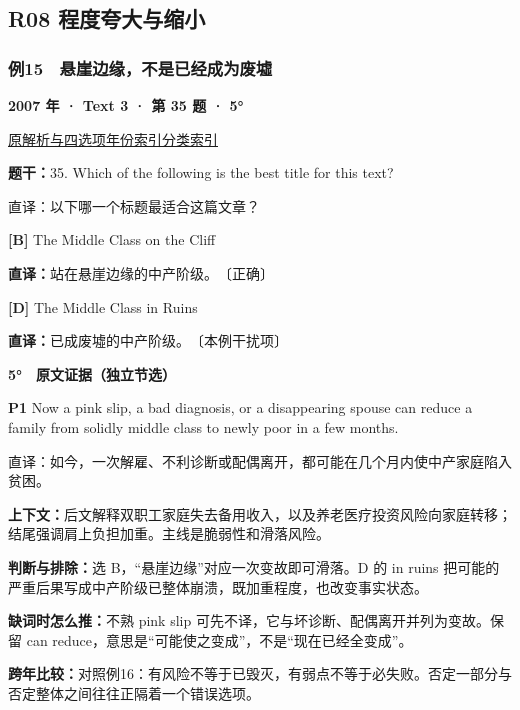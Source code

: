 \documentclass[11pt,a4paper]{article}
\begin{document}
\subsection{R08 程度夸大与缩小}
\subsubsection{例15　悬崖边缘，不是已经成为废墟}\label{case-2007-T3-Q35}
\noindent\textbf{2007 年 · Text 3 · 第 35 题 · 5°}\par\noindent \href{https://zj139.github.io/math-notes/english/346f4d489f00121c1d163691/\#q35}{原解析与四选项}\quad \hyperref[idx-2007-T3-Q35]{年份索引}\quad \hyperref[class-R08]{分类索引}\par\smallskip
\noindent\textbf{题干：}35. Which of the following is the best title for this text?\par
直译：以下哪一个标题最适合这篇文章？\par
{}\noindent\textbf{[B]} The Middle Class on the Cliff\par\nopagebreak
\noindent\textbf{直译：}站在悬崖边缘的中产阶级。　〔正确〕\par
{}\noindent\textbf{[D]} The Middle Class in Ruins\par\nopagebreak
\noindent\textbf{直译：}已成废墟的中产阶级。　〔本例干扰项〕\par
\begin{evidence}\textbf{5°　原文证据（独立节选）}\par
\textbf{P1} Now a pink slip, a bad diagnosis, or a disappearing spouse can reduce a family from solidly middle class to newly poor in a few months.\par 直译：如今，一次解雇、不利诊断或配偶离开，都可能在几个月内使中产家庭陷入贫困。\par
\end{evidence}
\noindent\textbf{上下文：}后文解释双职工家庭失去备用收入，以及养老医疗投资风险向家庭转移；结尾强调肩上负担加重。主线是脆弱性和滑落风险。\par
\noindent\textbf{判断与排除：}选 B，“悬崖边缘”对应一次变故即可滑落。D 的 in ruins 把可能的严重后果写成中产阶级已整体崩溃，既加重程度，也改变事实状态。\par
\noindent\textbf{缺词时怎么推：}不熟 pink slip 可先不译，它与坏诊断、配偶离开并列为变故。保留 can reduce，意思是“可能使之变成”，不是“现在已经全变成”。\par
\noindent\textbf{跨年比较：}对照例16：有风险不等于已毁灭，有弱点不等于必失败。否定一部分与否定整体之间往往正隔着一个错误选项。\par
\clearpage
\end{document}
